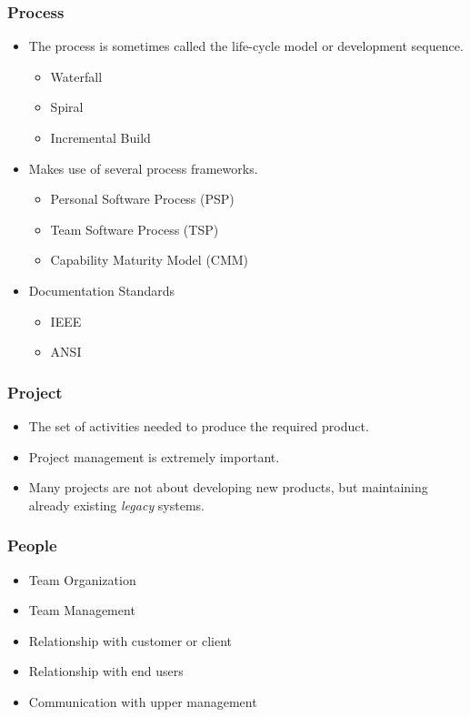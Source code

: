 \documentclass{report}
\begin{document}
		\subsubsection{Process}
			\begin{itemize}
				\item The process is sometimes called the life-cycle model or development sequence.
				\begin{itemize}
					\item Waterfall
					\item Spiral
					\item Incremental Build
				\end{itemize}
				\item Makes use of several process frameworks.
				\begin{itemize}
					\item Personal Software Process (PSP)
					\item Team Software Process (TSP)
					\item Capability Maturity Model (CMM)
				\end{itemize}
				\item Documentation Standards
				\begin{itemize}
					\item IEEE
					\item ANSI
				\end{itemize}
			\end{itemize}
		\subsubsection{Project}
			\begin{itemize}
				\item The set of activities needed to produce the required product.
				\item Project management is extremely important.
				\item Many projects are not about developing new products, but maintaining already existing \emph{legacy} systems.
			\end{itemize}
		\subsubsection{People}
			\begin{itemize}
				\item Team Organization
				\item Team Management
				\item Relationship with customer or client
				\item Relationship with end users
				\item Communication with upper management
			\end{itemize}
\end{document}
